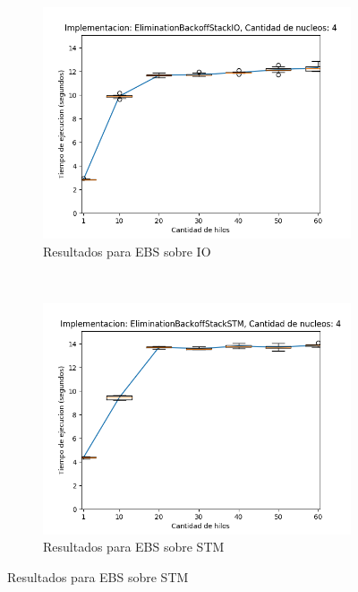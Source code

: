 \begin{appendices}
\begin{figure}[H]
    \centering
    \begin{subfigure}[b]{0.49\textwidth}
        \includegraphics[width=\textwidth]{images/numberOfThreadsDist/plots/expEBSIO-4}
        \caption{Resultados para EBS sobre IO}
        \label{subfig:numberOfThreadsDist-ebsio-4}
    \end{subfigure}
    ~
    \begin{subfigure}[b]{0.49\textwidth}
        \includegraphics[width=\textwidth]{images/numberOfThreadsDist/plots/expEBSSTM-4}
        \caption{Resultados para EBS sobre STM}
        \label{subfig:numberOfThreadsDist-ebsstm-4}
    \end{subfigure}

\end{figure}
\end{appendices}
